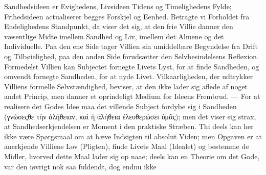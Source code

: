 \documentclass[12pt]{book}
\newcommand{\opage}[1]{\marginnote{\footnotesize\textit{[#1]}}}
\begin{document}
Sandhedsideen er Evighedens, Livsideen Tidens og Timelighedens Fylde; Frihedsideen
actualiserer begges Forskjel og Eenhed. Betragte vi Forholdet fra Endelighedens
Standpunkt, da viser det sig, at den frie Villie danner den væsentlige Midte imellem
Sandhed og Liv, imellem det Almene og det Individuelle. Paa den ene Side tager Villien
sin umiddelbare Begyndelse fra Drift og Tilbøielighed, paa den anden Side forudsætter
den Selvbesindelsens Reflexion. Formedelst Villien kan Subjectet fornegte Livets Lyst,
for at finde Sandheden, og omvendt fornegte Sandheden, for at nyde Livet.
Vilkaarligheden, der udtrykker Villiens formelle Selvstændighed, beviser, at den ikke
lader sig aflede af noget andet Princip, men danner et oprindeligt Medium for Ideens
Frembrud. --- For at realisere det Godes Idee maa det villende Subject fordybe sig i
Sandheden (γνώσεςθε τὴν ἀλήθειαν, καὶ ἡ ἀλήθεια ἐλευθερώσει ὑμᾶς); men det viser sig
strax, at Sandhedserkjendelsen er Moment i den praktiske Stræben. Thi deels kan her ikke
være Spørgsmaal om at hæve Indsigten til absolut Viden; men Opgaven er at anerkjende
Villiens Lov (Pligten), finde Livets Maal (Idealet) og bestemme de Midler, hvorved dette
Maal lader sig op%
\opage{254}naae; deels kan en Theorie om det Gode, var den iøvrigt nok saa fuldendt, dog endnu ikke
\end{document}
